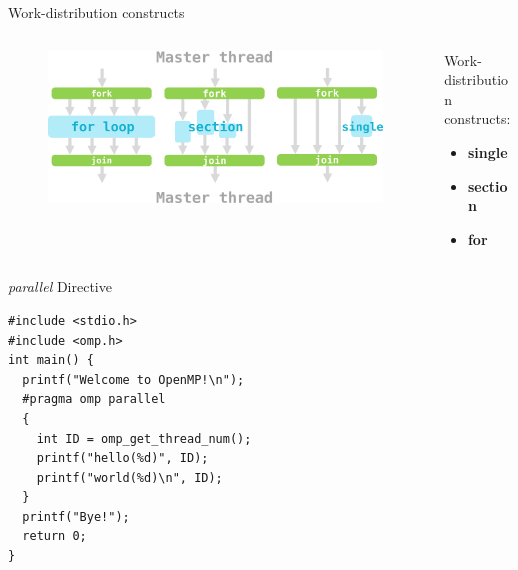 \begin{frame}{Work-distribution constructs}
  \begin{columns}[T]

    \begin{column}{0.7\textwidth}
      \begin{figure}
        \centering
        \includegraphics[width=1\linewidth]{day8_am/img/Work-distribution.png}
      \end{figure}
    \end{column}

    \begin{column}{0.3\textwidth}
      \vspace{2em}
      Work-distribution constructs:
      \begin{itemize}
        \item \textbf<1>{single}
        \item \textbf<2>{section}
        \item \textbf<3>{for}
      \end{itemize}
    \end{column}

  \end{columns}
\end{frame}

\begin{frame}[fragile]{\textit{parallel} Directive}
  \vspace{-10pt} %
  \begin{verbatim}
#include <stdio.h>
#include <omp.h>
int main() {
  printf("Welcome to OpenMP!\n");
  #pragma omp parallel
  {
    int ID = omp_get_thread_num();
    printf("hello(%d)", ID);
    printf("world(%d)\n", ID);
  }
  printf("Bye!");
  return 0;
}
      \end{verbatim}
\end{frame}

